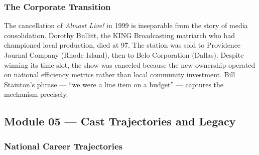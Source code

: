 \documentclass[11pt,letterpaper]{article}
\begin{document}
\subsubsection{The Corporate Transition}

The cancellation of \textit{Almost Live!} in 1999 is inseparable from the story of media consolidation. Dorothy Bullitt, the KING Broadcasting matriarch who had championed local production, died at 97. The station was sold to Providence Journal Company (Rhode Island), then to Belo Corporation (Dallas). Despite winning its time slot, the show was canceled because the new ownership operated on national efficiency metrics rather than local community investment. Bill Stainton's phrase --- ``we were a line item on a budget'' --- captures the mechanism precisely.

\subsection{Module 05 --- Cast Trajectories and Legacy}

\subsubsection{National Career Trajectories}
\end{document}
